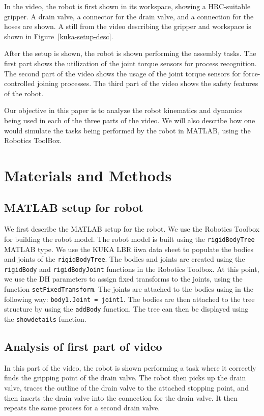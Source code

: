 \documentclass[conference]{IEEEtran}
\begin{document}
In the video, the robot is first shown in its workspace, showing a HRC-suitable
gripper. A drain valve, a connector for the drain valve, and a connection for
the hoses are shown. A still from the video describing the gripper and workspace is shown in Figure~\ref{kuka-setup-desc}.

After the setup is shown, the robot is shown performing the assembly tasks. The first
part shows the utilization of the joint torque sensors for process recognition. The second
part of the video shows the usage of the joint torque sensors for force-controlled
joining processes. The third part of the video shows the safety features of the robot.

Our objective in this paper is to analyze the robot kinematics and dynamics being
used in each of the three parts of the video. We will also describe how one would
simulate the tasks being performed by the robot in MATLAB, using the Robotics
ToolBox.

\section{Materials and Methods}

\subsection{MATLAB setup for robot}

We first describe the MATLAB setup for the robot. We use the Robotics Toolbox for
building the robot model. The robot model is built using the \texttt{rigidBodyTree} MATLAB type.
We use the KUKA LBR iiwa data sheet to populate the bodies and joints of the
\texttt{rigidBodyTree}. The bodies and joints are created using the \texttt{rigidBody} and
\texttt{rigidBodyJoint} functions in the Robotics Toolbox. At this point, we use
the DH parameters to assign fixed transforms to the joints, using the function
\texttt{setFixedTransform}.
The joints are attached to the bodies
using in the following way: \texttt{body1.Joint = joint1}. The bodies are then
attached to the tree structure by using the \texttt{addBody} function. The tree
can then be displayed using the \texttt{showdetails} function.
\subsection{Analysis of first part of video}

In this part of the video, the robot is shown performing a task where it correctly
finds the gripping point of the drain valve. The robot then picks up the drain valve,
traces the outline of the drain valve to the attached stopping point, and then inserts
the drain valve into the connection for the drain valve. It then repeats the same process
for a second drain valve.
\end{document}
